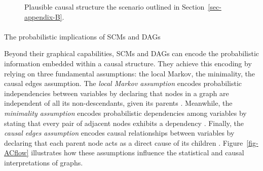 \documentclass[
  authoryear,
  review,
  1p]{elsarticle}
\makeatletter
\let\oldparagraph\paragraph
\renewcommand{\paragraph}{
    \@ifstar
      \xxxParagraphStar
      \xxxParagraphNoStar
  }
\newcommand{\xxxParagraphStar}[1]{\oldparagraph*{#1}\mbox{}}
\newcommand{\xxxParagraphNoStar}[1]{\oldparagraph{#1}\mbox{}}
\makeatother
\begin{document}
\begin{figure}

\begin{minipage}{0.50\linewidth}

\centering{

\[
\begin{aligned}
  X & := f_{X}(e_{X}) \\
  T & := f_{T}(X,e_{T}) \\
  Y & := f_{Y}(T,X,e_{Y}) \\
  e_{T} & \:\bot\:e_{X} \\
  e_{T} & \:\bot\:e_{Y} \\
  e_{X} & \:\bot\:e_{Y}
\end{aligned}
\]

}


\end{minipage}%
%
\begin{minipage}{0.50\linewidth}



\end{minipage}%

\caption{\label{fig-example1}Plausible causal structure the scenario
outlined in Section~\ref{sec-appendix-B}.}

\end{figure}%

\paragraph{The probabilistic implications of SCMs and
DAGs}\label{sec-appendix-B22}

Beyond their graphical capabilities, SCMs and DAGs can encode the
probabilistic information embedded within a causal structure. They
achieve this encoding by relying on three fundamental assumptions: the
local Markov, the minimality, the causal edges assumption. The
\emph{local Markov assumption} encodes probabilistic independencies
between variables by declaring that nodes in a graph are independent of
all its non-descendants, given its parents \citep[pp.~20]{Neal_2020}.
Meanwhile, the \emph{minimality assumption} encodes probabilistic
dependencies among variables by stating that every pair of adjacent
nodes exhibits a dependency \citep[pp.~21]{Neal_2020}. Finally, the
\emph{causal edges assumption} encodes causal relationships between
variables by declaring that each parent node acts as a direct cause of
its children \citep[pp.~22]{Neal_2020}. Figure~\ref{fig-ACflow}
illustrates how these assumptions influence the statistical and causal
interpretations of graphs.
\end{document}
